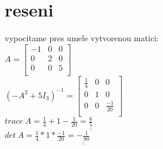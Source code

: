 \documentclass[a4paper]{article}
\def\doubleunderline#1{\underline{\underline{#1}}}
\begin{document}
\section*{reseni}
vypocitame pres umele vytvorenou matici:\\
$A=\left[\begin{matrix}
	-1 & 0 & 0\\
	0 & 2 & 0\\
	0 & 0 & 5\\
\end{matrix}\right]$\\
$(-A^2+5I_3)^{-1}=
\left[\begin{matrix}
	\frac{1}{4} & 0 & 0\\
	0 & 1 & 0\\
	0 & 0 & \frac{-1}{20}\\
\end{matrix}\right]$\\
$trace~A = \frac{1}{4}+1-\frac{1}{20} = \doubleunderline{\frac{6}{5}}$\\
$det~A = \frac{1}{4}*1*\frac{-1}{20} = \doubleunderline{-\frac{1}{80}}$\\
\end{document}
